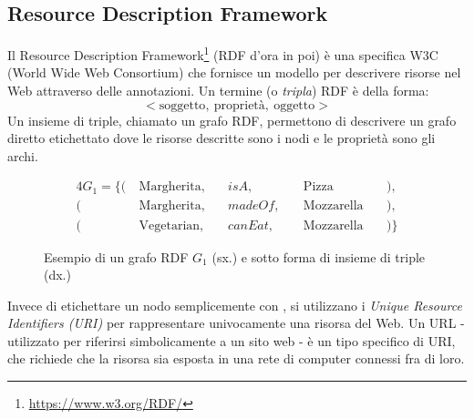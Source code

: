 \subsection[Resource Description Framework]{Resource Description Framework}
Il Resource Description Framework\footnote{\url{https://www.w3.org/RDF/}} (RDF d'ora in poi) è una specifica W3C (World Wide Web Consortium) che fornisce un modello per descrivere risorse nel Web attraverso delle annotazioni. Un termine (o \emph{tripla}) RDF è della forma:
\[ < \text{soggetto},\ \text{proprietà},\ \text{oggetto} > \]
Un insieme di triple, chiamato un grafo RDF, permettono di descrivere un grafo diretto etichettato dove le risorse descritte sono i nodi e le proprietà sono gli archi.
\begin{figure}[h]
  \begin{minipage}{0.3\linewidth}
    \centering
  \end{minipage}
  \hspace{5mm}
  \begin{minipage}{0.7\linewidth}
    \begin{alignat*}{4}
      G_1 = \{ (\  & \text{Margherita},\  &  & isA,      &  & \text{Pizza}        &  & ),  \\
      (\           & \text{Margherita},\  &  & madeOf,\  &  & \text{Mozzarella}\  &  & ),  \\
      (\           & \text{Vegetarian},\  &  & canEat,\  &  & \text{Mozzarella}\  &  & )\}
    \end{alignat*}
  \end{minipage}
  \caption{Esempio di un grafo RDF $G_1$ (sx.) e sotto forma di insieme di triple (dx.)}
\end{figure}

\noindent
Invece di etichettare un nodo semplicemente con , si utilizzano i \emph{Unique Resource Identifiers (URI)} per rappresentare univocamente una risorsa del Web. Un URL - utilizzato per riferirsi simbolicamente a un sito web - è un tipo specifico di URI, che richiede che la risorsa sia esposta in una rete di computer connessi fra di loro.

